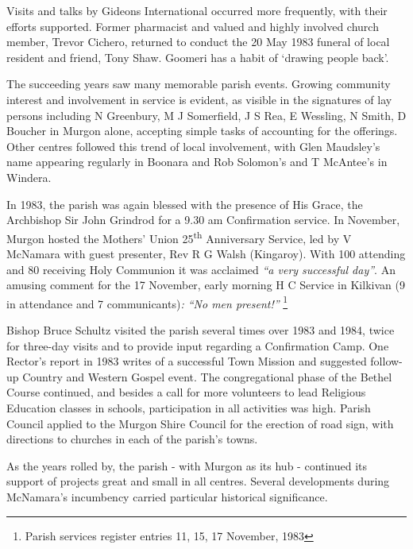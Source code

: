 Visits and talks by Gideons International occurred more frequently, with their efforts supported. Former pharmacist and valued and highly involved church member, Trevor Cichero, returned to conduct the 20 May 1983 funeral of local resident and friend, Tony Shaw. Goomeri has a habit of `drawing people back'.



The succeeding years saw many memorable parish events. Growing community interest and involvement in service is evident, as visible in the signatures of lay persons including N Greenbury, M J Somerfield, J S Rea, E Wessling, N Smith, D Boucher in Murgon alone, accepting simple tasks of accounting for the offerings. Other centres followed this trend of local involvement, with Glen Maudsley's name appearing regularly in Boonara and Rob Solomon's and T McAntee's in Windera.



In 1983, the parish was again blessed with the presence of His Grace, the Archbishop Sir John Grindrod for a 9.30 am Confirmation service. In November, Murgon hosted the Mothers' Union 25\textsuperscript{th} Anniversary Service, led by V McNamara with guest presenter, Rev R G Walsh (Kingaroy). With 100 attending and 80 receiving Holy Communion it was acclaimed \emph{``a very successful day''}. An amusing comment for the 17 November, early morning H C Service in Kilkivan (9 in attendance and 7 communicants)\emph{: ``No men present!''} \footnote{Parish services register entries 11, 15, 17 November, 1983}


Bishop Bruce Schultz visited the parish several times over 1983 and 1984, twice for three-day visits and to provide input regarding a Confirmation Camp. One Rector's report in 1983 writes of a successful Town Mission and suggested follow-up Country and Western Gospel event. The congregational phase of the Bethel Course continued, and besides a call for more volunteers to lead Religious Education classes in schools, participation in all activities was high. Parish Council applied to the Murgon Shire Council for the erection of road sign, with directions to churches in each of the parish's towns.



As the years rolled by, the parish - with Murgon as its hub - continued its support of projects great and small in all centres. Several developments during McNamara's incumbency carried particular historical significance.




